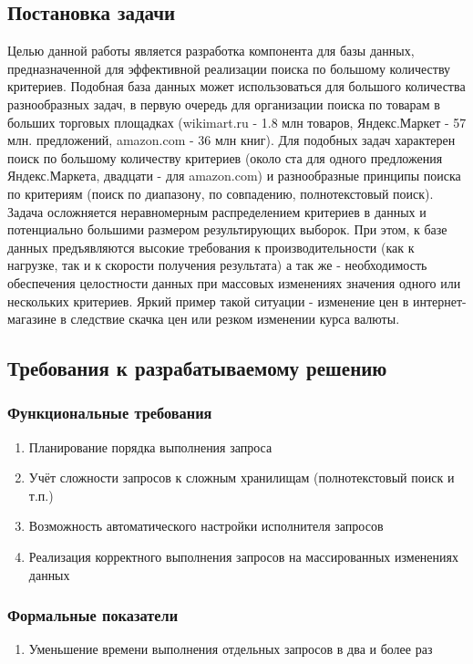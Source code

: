 \documentclass{matmex-diploma}
\begin{document}
    \subsection{Постановка задачи}
        Целью данной работы является разработка компонента для базы данных, предназначенной для эффективной реализации поиска по большому количеству критериев. Подобная база данных может использоваться для большого количества разнообразных задач, в первую очередь для организации поиска по товарам в больших торговых площадках (wikimart.ru - 1.8 млн товаров, Яндекс.Маркет - 57 млн. предложений, amazon.com - 36 млн книг). Для подобных задач характерен поиск по большому количеству критериев (около ста для одного предложения Яндекс.Маркета, двадцати - для amazon.com) и разнообразные принципы поиска по критериям (поиск по диапазону, по совпадению, полнотекстовый поиск). Задача осложняется неравномерным распределением критериев в данных и потенциально большими размером результирующих выборок. При этом, к базе данных предъявляются высокие требования к производительности (как к нагрузке, так и к скорости получения результата) а так же - необходимость обеспечения целостности данных при массовых изменениях значения одного или нескольких критериев. Яркий пример такой ситуации - изменение цен в интернет-магазине в следствие скачка цен или резком изменении курса валюты.
    \subsection{Требования к разрабатываемому решению}
        \subsubsection{Функциональные требования}
            \begin{enumerate}
                \item Планирование порядка выполнения запроса
                \item Учёт сложности запросов к сложным хранилищам (полнотекстовый поиск и т.п.)
                \item Возможность автоматического настройки исполнителя запросов
                \item Реализация корректного выполнения запросов на массированных изменениях данных
            \end{enumerate}
        \subsubsection{Формальные показатели}
            \begin{enumerate} 
                \item Уменьшение времени выполнения отдельных запросов в два и более раз
            \end{enumerate}
\end{document}
